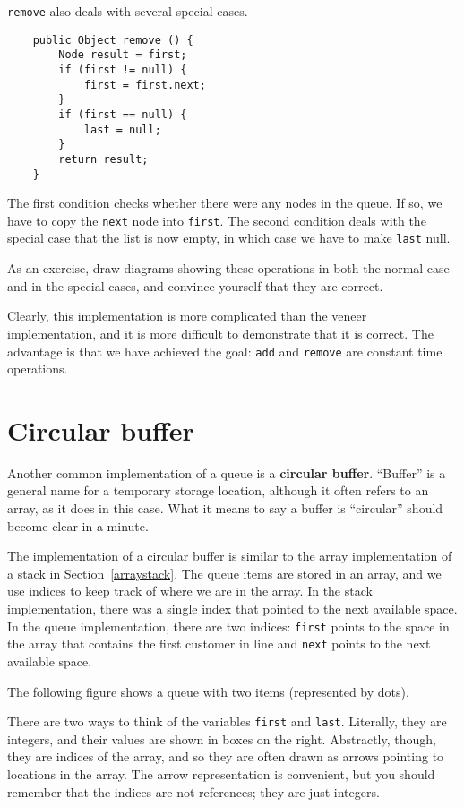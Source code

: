 {\tt remove} also deals with several special cases.

\begin{verbatim}
    public Object remove () {
        Node result = first;
        if (first != null) {
            first = first.next;
        }
        if (first == null) {
            last = null;
        }
        return result;
    }
\end{verbatim}
%
The first condition checks whether there were any nodes in
the queue.  If so, we have to copy the {\tt next} node into
{\tt first}.  The second condition deals with the special
case that the list is now empty, in which case we have to
make {\tt last} null.

As an exercise, draw diagrams showing these operations in
both the normal case and in the special cases, and convince
yourself that they are correct.

Clearly, this implementation is more complicated than the
veneer implementation, and it is more difficult to demonstrate
that it is correct.  The advantage is that we have achieved
the goal: {\tt add} and {\tt remove} are constant
time operations.


\section{Circular buffer}

Another common implementation of a queue is a {\bf circular
buffer}.  ``Buffer'' is a general name for a temporary storage
location, although it often refers to an array, as it does in
this case.  What it means to say a buffer is ``circular'' should
become clear in a minute.

The implementation of a circular buffer is similar to the array
implementation of a stack in Section~\ref{arraystack}.  The
queue items are stored in an array, and we use indices to
keep track of where we are in the array.  In the stack implementation,
there was a single index that pointed to the next available space.
In the queue implementation, there are two indices: {\tt first}
points to the space in the array that contains the first customer
in line and {\tt next} points to the next available space.

The following figure shows a queue with two items (represented
by dots).


There are two ways to think of the variables {\tt first} and
{\tt last}.  Literally, they are integers, and their values are
shown in boxes on the right.  Abstractly, though, they are
indices of the array, and so they are often drawn as arrows
pointing to locations in the array.  The arrow representation is
convenient, but you should remember that the indices are not
references; they are just integers.


